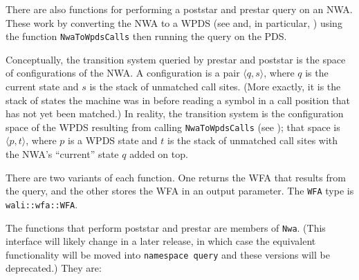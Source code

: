 There are also functions for performing a poststar and prestar
query on an NWA. These work by converting the NWA to a WPDS (see
 and, in particular, ) using
the function \texttt{NwaToWpdsCalls} then running the query on the PDS.

Conceptually, the transition system queried by prestar and poststar is the space of
configurations of the NWA. A configuration is a pair $\langle q, s\rangle$,
where $q$ is the current state and $s$ is the stack of unmatched call
sites. (More exactly, it is the stack of states the machine was in before
reading a symbol in a call position that has not yet been matched.) In
reality,  the transition system is the configuration space of the WPDS
resulting from calling \texttt{NwaToWpdsCalls} (see
); that space is
$\langle p, t\rangle$, where $p$ is a WPDS state and $t$ is the stack of
unmatched call sites with the NWA's ``current'' state $q$ added on top.

There are two variants of each function. One returns the WFA that results from
the query, and the other stores the WFA in an output parameter. The
\texttt{WFA} type is \texttt{wali::wfa::WFA}.

\begin{comment}
The functions that perform poststar and prestar are in the namespace
\texttt{opennwa::query} and are declared in the header
\texttt{opennwa/query/weighted.hpp}. They are:
\begin{functionlist}
  \functionDefEarly{WFA}{prestar}{Nwa const \& nwa, WFA const \& input, WeightGen \& wg}{}
  \functionDefEarly{void}{prestar}{Nwa const \& nwa, WFA const \& input, WFA \& output, WeightGen \& wg}{}
  \functionDefEarly{WFA}{poststar}{Nwa const \& nwa, WFA const \& input, WeightGen \& wg}{}
  \functionDefEarly{void}{poststar}{Nwa const \& nwa, WFA const \& input, WFA \& output, WeightGen \& wg}{}
    Computes the prestar or poststar of the configurations specified by
    \texttt{input}, using the weights generated by \texttt{wg}. Either
    returns the result or stores it in the parameter \texttt{output}.
\end{functionlist}
\end{comment}

The functions that perform poststar and prestar are members of
\texttt{Nwa}. (This interface will likely change in a later release, in which
case the equivalent functionality will be moved into \texttt{namespace
  query} and these versions will be deprecated.)  They are:

